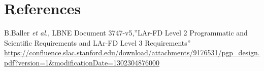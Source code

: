 
\section{References}

\begin{thebibliography}{99}

 B.Baller {\it et al.}, LBNE Document 3747-v5,''LAr-FD Level 2 Programmatic and
Scientific Requirements and LAr-FD Level 3 Requirements''
\url{https://confluence.slac.stanford.edu/download/attachments/9176531/pgp_design.pdf?version=1&modificationDate=1302304876000}
	               
\end{thebibliography} 